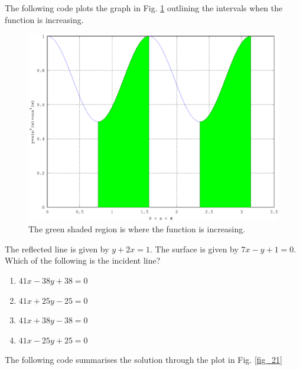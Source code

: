 \documentclass[journal,12pt,twocolumn]{IEEEtran}
\begin{document}
\solution The following code plots the graph in Fig. \ref{fig_20} outlining the intervals when the function is increasing.

%
\begin{figure}[h]
\centering
\includegraphics[width=\columnwidth]{./figs/ee16b1020}
\caption{ The green shaded region is where the function is increasing.}
\label{fig_20}	
\end{figure}
%
\begin{problem}
The reflected line is given by $y+2x=1$. The surface is given by $7x-y+1=0$. Which of the following is the incident line?
\begin{enumerate}
\item $41x - 38y +38 = 0$
\item $41x +25y - 25 = 0$
\item $41x + 38y-38=0$
\item $41x-25y+25=0$
\end{enumerate}
\end{problem}
\solution

The following code  summarises the solution through the plot in Fig. \ref{fig_21}

%
\end{document}
